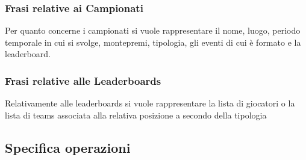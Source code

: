 \documentclass{article}
\begin{document}
\subsubsection{Frasi relative ai Campionati}

Per quanto concerne i campionati si vuole rappresentare il nome, luogo, periodo temporale in cui si svolge, montepremi, tipologia, gli eventi di cui è formato e la leaderboard.

\subsubsection{Frasi relative alle Leaderboards}

Relativamente alle leaderboards si vuole rappresentare la lista di giocatori o la lista di teams associata alla relativa posizione a secondo della tipologia

\subsection{Specifica operazioni}
\end{document}
